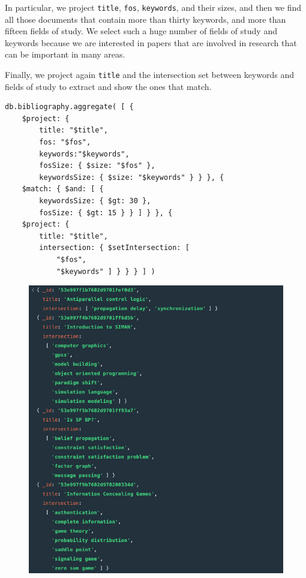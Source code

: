 \begin{enumerate}
    In particular, we project \verb|title|, \verb|fos|, \verb|keywords|, and their sizes, and then we find all those documents that contain more than thirty keywords, and more than fifteen fields of study.
    We select such a huge number of fields of study and keywords because we are interested in papers that are involved in research that can be important in many areas.

    Finally, we project again \verb|title| and the intersection set between keywords and fields of study to extract and show the ones that match.
    \begin{lstlisting}[label={lst:query3mongodb}]
db.bibliography.aggregate( [ {
    $project: {
        title: "$title",
        fos: "$fos",
        keywords:"$keywords",
        fosSize: { $size: "$fos" },
        keywordsSize: { $size: "$keywords" } } }, {
    $match: { $and: [ {
        keywordsSize: { $gt: 30 },
        fosSize: { $gt: 15 } } ] } }, {
    $project: {
        title: "$title",
        intersection: { $setIntersection: [
            "$fos",
            "$keywords" ] } } } ] )
    \end{lstlisting}
    \begin{figure}[H]
        \begin{center}
            \includegraphics[width=0.9\linewidth]{ImagesMongoDB/query3mongodb}
            \label{fig:query3mongodb}%
        \end{center}
    \end{figure}


\end{enumerate}
